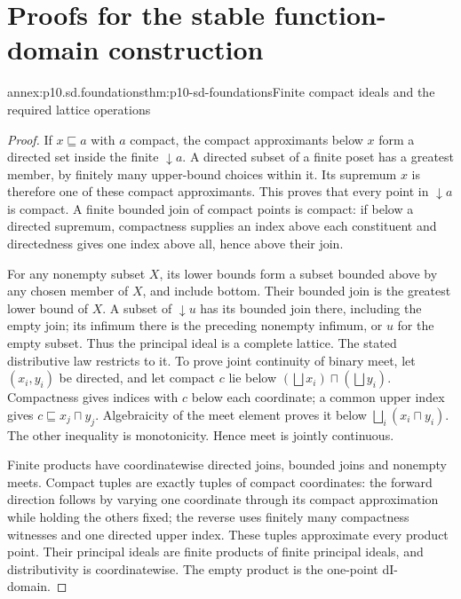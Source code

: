 \section{Proofs for the stable function-domain construction}
\label{annex:p10-stable-domains-sequential-models}

\begin{annexitem}{annex:p10.sd.foundations}{thm:p10-sd-foundations}{Finite compact ideals and the required lattice operations}
\begin{proof}
If \(x\sqsubseteq a\) with \(a\) compact, the compact approximants
below \(x\) form a directed set inside the finite \(\downarrow a\).
A directed subset of a finite poset has a greatest member, by finitely
many upper-bound choices within it. Its supremum \(x\) is therefore
one of these compact approximants. This proves that every point in
\(\downarrow a\) is compact. A finite bounded join of compact points
is compact: if below a directed supremum, compactness supplies an index
above each constituent and directedness gives one index above all, hence
above their join.

For any nonempty subset \(X\), its lower bounds form a subset bounded
above by any chosen member of \(X\), and include bottom. Their bounded
join is the greatest lower bound of \(X\). A subset of \(\downarrow u\)
has its bounded join there, including the empty join; its infimum there
is the preceding nonempty infimum, or \(u\) for the empty subset.
Thus the principal ideal is a complete lattice. The stated distributive
law restricts to it.
To prove joint continuity of binary meet, let \((x_i,y_i)\) be directed,
and let compact \(c\) lie below \((\bigsqcup x_i)\sqcap(\bigsqcup y_i)\).
Compactness gives indices with \(c\) below each coordinate; a common
upper index gives \(c\sqsubseteq x_j\sqcap y_j\). Algebraicity of
the meet element proves it below \(\bigsqcup_i(x_i\sqcap y_i)\).
The other inequality is monotonicity. Hence meet is jointly continuous.

Finite products have coordinatewise directed joins, bounded joins and
nonempty meets. Compact tuples are exactly tuples of compact coordinates:
the forward direction follows by varying one coordinate through its
compact approximation while holding the others fixed; the reverse uses
finitely many compactness witnesses and one directed upper index.
These tuples approximate every product point. Their principal ideals are
finite products of finite principal ideals, and distributivity is
coordinatewise. The empty product is the one-point dI-domain.
\end{proof}
\end{annexitem}

